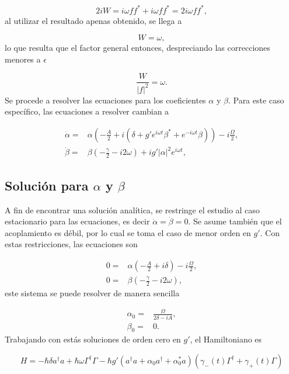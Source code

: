 \documentclass[a4paper,10pt]{report}
\begin{document}
\begin{equation}
2iW = i\omega ff^* + i\omega ff^* = 2i\omega ff^*,
\end{equation} al utilizar el resultado apenas obtenido, se llega a

\begin{equation}
W = \omega,
\end{equation} lo que resulta que el factor general entonces, despreciando las correcciones menores a $\epsilon$

\begin{equation}
\frac{W}{|f|^2} = \omega.
\end{equation} Se procede a resolver las ecuaciones para los coeficientes $\alpha$ y $\beta$. Para este caso específico, las ecuaciones a resolver cambian a

\begin{align}
\dot{\alpha} =& \alpha(-\frac{A}{2}+i(\delta+g'e^{i\omega t} \beta^* + e^{-i\omega t} \beta))-i\frac{\Omega}{2},\\
\dot{\beta} =& \beta(-\frac{\gamma}{2}-i 2\omega)+ig'|\alpha|^2e^{i\omega t},
\end{align}

\subsection{Solución para $\alpha$ y $\beta$}

A fin de encontrar una solución analítica, se restringe el estudio al caso estacionario para las ecuaciones, es decir $\dot{\alpha}= \dot{\beta} = 0$. Se asume también que el acoplamiento es débil, por lo cual se toma el caso de menor orden en $g'$. Con estas restricciones, las ecuaciones son

\begin{align}
0 =& \alpha(-\frac{A}{2}+i\delta)-i\frac{\Omega}{2},\\
0 =& \beta(-\frac{\gamma}{2}-i 2\omega),
\end{align} este sistema se puede resolver de manera sencilla

\begin{align}
\alpha_0 =& \frac{\Omega}{2\delta-iA},\\
\beta_0 =& 0.
\end{align} Trabajando con estás soluciones de orden cero en $g'$, el Hamiltoniano es

\begin{equation}
H = -\hbar \delta a^{\dagger}a +\hbar\omega\Gamma^{\dagger}\Gamma -\hbar g'(a^{\dagger}a +\alpha_0 a^{\dagger}+\alpha^*_0 a)(\gamma_-(t)\Gamma^{\dagger}+\gamma_+(t)\Gamma)
\end{equation}
\end{document}
